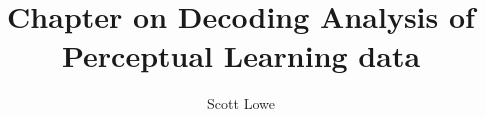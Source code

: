 \documentclass[a4paper,10pt]{article}  %
\begin{document}
%
\title{Chapter on Decoding Analysis of Perceptual Learning data}
\author{Scott Lowe}
\date{}       %
\maketitle
%
%
%
%
%
%
%





%
%
%
%
\FloatBarrier
%
%

%
%
%
%
%
\end{document}
